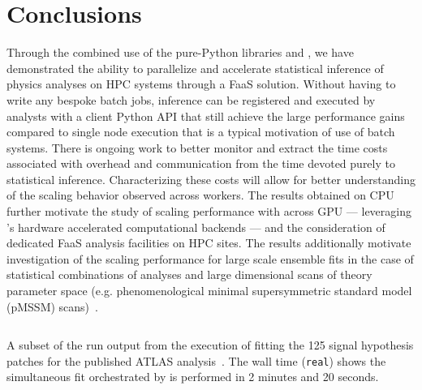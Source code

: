 \section{Conclusions}\label{sec:conclusions}

Through the combined use of the pure-Python libraries \funcX{} and \pyhf{}, we have demonstrated the ability to parallelize and accelerate statistical inference of physics analyses on HPC systems through a FaaS solution.
Without having to write any bespoke batch jobs, inference can be registered and executed by analysts with a client Python API that still achieve the large performance gains compared to single node execution that is a typical motivation of use of batch systems.
There is ongoing work to better monitor and extract the time costs associated with overhead and communication from the time devoted purely to statistical inference.
Characterizing these costs will allow for better understanding of the scaling behavior observed across workers.
The results obtained on CPU further motivate the study of scaling performance with \funcX{} across GPU --- leveraging \pyhf{}'s hardware accelerated computational backends --- and the consideration of dedicated FaaS analysis facilities on HPC sites.
The results additionally motivate investigation of the scaling performance for large scale ensemble fits in the case of statistical combinations of analyses and large dimensional scans of theory parameter space (e.g. phenomenological minimal supersymmetric standard model (pMSSM) scans)~\cite{Ambrogi:2017lov,Heinrich:2216178}.

\begin{listing}
 \inputminted{text}{src/code/funcX_demo_output.txt}
 \caption{A subset of the run output from the execution of fitting the 125 signal hypothesis patches for the published ATLAS analysis~\cite{SUSY-2019-08}.
 The wall time (\texttt{real}) shows the simultaneous fit orchestrated by \funcX{} is performed in 2 minutes and 20 seconds.}
 \label{lst:funcX_demo_output}
\end{listing}
